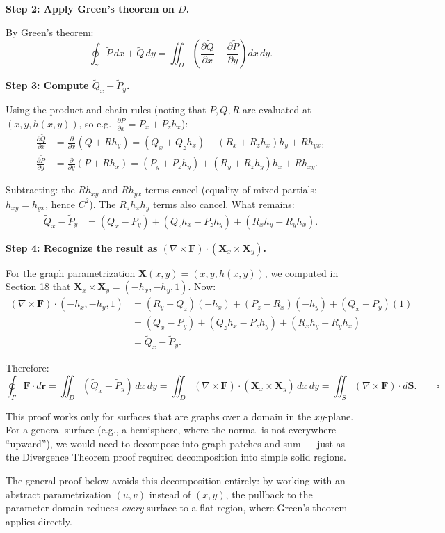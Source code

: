 \documentclass[11pt]{report}
\newcommand{\parti}[2]{\frac{\partial #1}{\partial #2}}
\begin{document}
\textbf{Step 2: Apply Green's theorem on $D$.}

By Green's theorem:
\[
\oint_\gamma \tilde{P} \, dx + \tilde{Q} \, dy = \iint_D \left(\parti{\tilde{Q}}{x} - \parti{\tilde{P}}{y}\right) dx \, dy.
\]

\textbf{Step 3: Compute $\tilde{Q}_x - \tilde{P}_y$.}

Using the product and chain rules (noting that $P, Q, R$ are evaluated at $(x, y, h(x,y))$, so e.g.\ $\parti{P}{x} = P_x + P_z h_x$):
\begin{align*}
\parti{\tilde{Q}}{x} &= \parti{}{x}(Q + Rh_y) = (Q_x + Q_z h_x) + (R_x + R_z h_x)h_y + R h_{yx}, \\
\parti{\tilde{P}}{y} &= \parti{}{y}(P + Rh_x) = (P_y + P_z h_y) + (R_y + R_z h_y)h_x + R h_{xy}.
\end{align*}

Subtracting: the $Rh_{xy}$ and $Rh_{yx}$ terms cancel (equality of mixed partials: $h_{xy} = h_{yx}$, hence $C^2$). The $R_z h_x h_y$ terms also cancel. What remains:
\begin{align*}
\tilde{Q}_x - \tilde{P}_y &= (Q_x - P_y) + (Q_z h_x - P_z h_y) + (R_x h_y - R_y h_x).
\end{align*}

\textbf{Step 4: Recognize the result as $(\nabla \times \mathbf{F}) \cdot (\mathbf{X}_x \times \mathbf{X}_y)$.}

For the graph parametrization $\mathbf{X}(x,y) = (x, y, h(x,y))$, we computed in Section 18 that $\mathbf{X}_x \times \mathbf{X}_y = (-h_x, -h_y, 1)$. Now:
\begin{align*}
(\nabla \times \mathbf{F}) \cdot (-h_x, -h_y, 1) &= (R_y - Q_z)(-h_x) + (P_z - R_x)(-h_y) + (Q_x - P_y)(1) \\
&= (Q_x - P_y) + (Q_z h_x - P_z h_y) + (R_x h_y - R_y h_x) \\
&= \tilde{Q}_x - \tilde{P}_y.
\end{align*}

Therefore:
\[
\oint_\Gamma \mathbf{F} \cdot d\mathbf{r} = \iint_D (\tilde{Q}_x - \tilde{P}_y) \, dx \, dy = \iint_D (\nabla \times \mathbf{F}) \cdot (\mathbf{X}_x \times \mathbf{X}_y) \, dx \, dy = \iint_S (\nabla \times \mathbf{F}) \cdot d\mathbf{S}. \qquad \square
\]

\begin{remark}
This proof works only for surfaces that are graphs over a domain in the $xy$-plane. For a general surface (e.g., a hemisphere, where the normal is not everywhere ``upward''), we would need to decompose into graph patches and sum --- just as the Divergence Theorem proof required decomposition into simple solid regions.

The general proof below avoids this decomposition entirely: by working with an abstract parametrization $(u,v)$ instead of $(x,y)$, the pullback to the parameter domain reduces \textit{every} surface to a flat region, where Green's theorem applies directly.
\end{remark}
\end{document}
